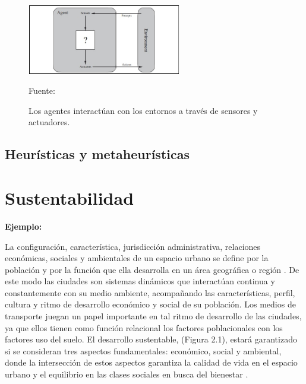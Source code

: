 \begin{figure}[ht]
\begin{center}
\includegraphics[width=0.6\textwidth]{Figura1}
\end{center}
\begin{center}
\vskip -0.5cm
\caption{\small{Los agentes interactúan con los entornos a través de sensores y actuadores.}}
{\small{Fuente: \cite{Russel}}}
\end{center}
\end{figure}


\subsection{Heurísticas y metaheurísticas}

\section{Sustentabilidad}

{\bf Ejemplo:}\par

La configuración, característica, jurisdicción administrativa, relaciones económicas, sociales y ambientales de un espacio urbano se define por la población y por la función que ella desarrolla en un área geográfica o región \citep{Bugliarello}. De este modo las ciudades son sistemas dinámicos que interactúan continua y constantemente con su medio ambiente, acompañando las características, perfil, cultura y ritmo de desarrollo económico y social de su población. Los medios de transporte juegan un papel importante en tal ritmo de desarrollo de las ciudades, ya que ellos tienen como función relacional los factores poblacionales con los factores uso del suelo.  
\vskip 1cm
El desarrollo sustentable, (Figura 2.1), estará garantizado si se consideran tres aspectos fundamentales: económico, social y ambiental, donde la intersección de estos aspectos garantiza la calidad de vida en el espacio urbano y el equilibrio en las clases sociales en busca del bienestar \citep{Tanguay}.

